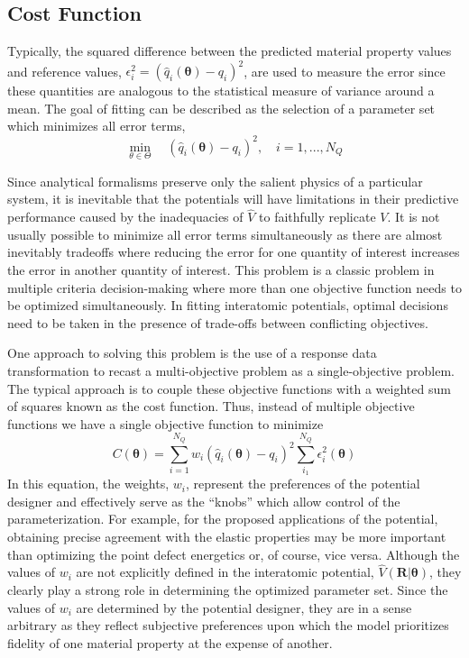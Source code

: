 \subsection{Cost Function}
\label{subsec:cost_function}

Typically, the squared difference between the predicted material property values and reference values, $\epsilon_i^2=(\hat{q}_i(\bm{\theta})-q_i)^2$, are used to measure the error since these quantities are analogous to the statistical measure of variance around a mean. The goal of fitting can be described as the selection of a parameter set which minimizes all error terms,
\begin{equation}
\label{eq:moo_LS}
	\min_{\theta\in\Theta}
		  \quad  (\hat{q}_i(\bm{\theta})-q_i)^2,
						\quad i = 1,...,N_Q
\end{equation}

Since analytical formalisms preserve only the salient physics of a particular system, it is inevitable that the potentials will have limitations in their predictive performance caused by the inadequacies of $\hat{V}$ to faithfully replicate $V$.  It is not usually possible to minimize all error terms simultaneously as there are almost inevitably tradeoffs where reducing the error for one quantity of interest increases the error in another quantity of interest.  This problem is a classic problem in multiple criteria decision-making where more than one objective function needs to be optimized simultaneously\cite{miettinen1998_mcdm}.  In fitting interatomic potentials, optimal decisions need to be taken in the presence of trade-offs between conflicting objectives.

One approach to solving this problem is the use of a response data transformation to recast a multi-objective problem as a single-objective problem.  The typical approach is to couple these objective functions with a weighted sum of squares known as the cost function. Thus, instead of multiple objective functions we have a single objective function to minimize
\begin{equation}
	\label{eq:cost_function_LS}
	C(\bm{\theta})=\sum_{i=1}^{N_Q}w_i(\hat{q}_i(\bm{\theta})-q_i)^2
		\sum_{i_1}^{N_Q} \epsilon_i^2(\bm{\theta})
\end{equation}
In this equation, the weights, $w_i$, represent the preferences of the potential designer and effectively serve as the “knobs” which allow control of the parameterization. For example, for the proposed applications of the potential, obtaining precise agreement with the elastic properties may be more important than optimizing the point defect energetics or, of course, vice versa. Although the values of $w_i$ are not explicitly defined in the interatomic potential, $\hat{V}(\bm{R}|\bm{\theta})$, they clearly play a strong role in determining the optimized parameter set.  Since the values of $w_i$ are determined by the potential designer, they are in a sense arbitrary as they reflect subjective preferences upon which the model prioritizes fidelity of one material property at the expense of another.

